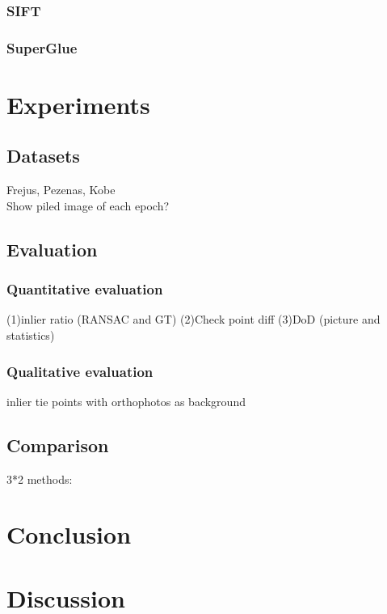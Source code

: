 \subsubsection{SIFT}
\subsubsection{SuperGlue}

\section{Experiments}
\subsection{Datasets}
Frejus, Pezenas, Kobe\\
Show piled image of each epoch?
\subsection{Evaluation}
\subsubsection{Quantitative evaluation}
(1)inlier ratio (RANSAC and GT)
(2)Check point diff
(3)DoD (picture and statistics)
\subsubsection{Qualitative evaluation}
inlier tie points with orthophotos as background
\subsection{Comparison}
3*2 methods:

\section{Conclusion}

\section{Discussion}
